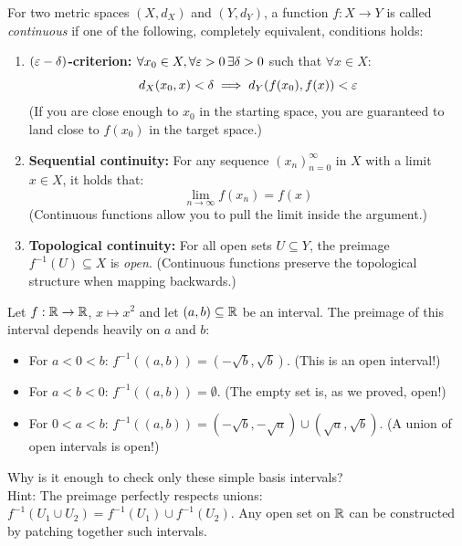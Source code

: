 \vspace{0.5cm}

\begin{definition*}
For two metric spaces $(X, d_X)$ and $(Y, d_Y)$, a function $f: X \to Y$ is called \emph{continuous} if one of the following, completely equivalent, conditions holds:

\begin{enumerate}
    \item \textbf{$(\varepsilon-\delta)$-criterion:} $\forall x_0 \in X, \forall \varepsilon > 0 \, \exists \delta > 0$ such that $\forall x \in X$:
    \[ d_X(x_0, x) < \delta \implies d_Y(f(x_0), f(x)) < \varepsilon \]
    \textcolor{eGray}{(If you are close enough to $x_0$ in the starting space, you are guaranteed to land close to $f(x_0)$ in the target space.)}
    
    \item \textbf{Sequential continuity:} For any sequence $(x_n)_{n=0}^\infty$ in $X$ with a limit $x \in X$, it holds that:
    \[ \lim_{n \to \infty} f(x_n) = f(x) \]
    \textcolor{eGray}{(Continuous functions allow you to pull the limit inside the argument.)}
    
    \item \textbf{Topological continuity:} For all open sets $U \subseteq Y$, the preimage $f^{-1}(U) \subseteq X$ is \emph{open}.
    \textcolor{eGray}{(Continuous functions preserve the topological structure when mapping backwards.)}
\end{enumerate}
\end{definition*}

\begin{example*}
Let $f: \mathbb{R} \to \mathbb{R}$, $x \mapsto x^2$ and let $(a,b) \subseteq \mathbb{R}$ be an interval. The preimage of this interval depends heavily on $a$ and $b$:
\begin{itemize}
    \item For $a < 0 < b$: $f^{-1}((a,b)) = (-\sqrt{b}, \sqrt{b})$. \textcolor{eGray}{(This is an open interval!)}
    \item For $a < b < 0$: $f^{-1}((a,b)) = \emptyset$. \textcolor{eGray}{(The empty set is, as we proved, open!)}
    \item For $0 < a < b$: $f^{-1}((a,b)) = (-\sqrt{b}, -\sqrt{a}) \cup (\sqrt{a}, \sqrt{b})$. \textcolor{eGray}{(A union of open intervals is open!)}
\end{itemize}
\textcolor{eDarkCyan}{Why is it enough to check only these simple basis intervals?} \\
\textcolor{eGray}{Hint: The preimage perfectly respects unions: $f^{-1}(U_1 \cup U_2) = f^{-1}(U_1) \cup f^{-1}(U_2)$. Any open set on $\mathbb{R}$ can be constructed by patching together such intervals.}
\end{example*}

